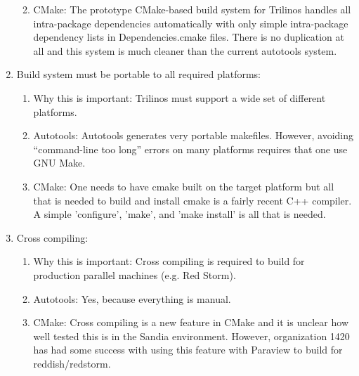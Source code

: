 \documentclass[pdf,ps2pdf,11pt]{SANDreport}
\begin{document}
\begin{enumerate}
\begin{enumerate}
  {}\item CMake: The prototype CMake-based build system for Trilinos
  handles all intra-package dependencies automatically with only simple
  intra-package dependency lists in Dependencies.cmake files.  There
  is no duplication at all and this system is much cleaner than the
  current autotools system.

  \end{enumerate}

{}\item Build system must be portable to all required platforms:

  \begin{enumerate}

  {}\item Why this is important: Trilinos must support a wide set of
  different platforms.

  {}\item Autotools: Autotools generates very portable makefiles.
  However, avoiding ``command-line too long'' errors on many
  platforms requires that one use GNU Make.

  {}\item CMake: One needs to have cmake built on the target
  platform but all that is needed to build and install cmake is a
  fairly recent C++ compiler.  A simple 'configure', 'make', and
  'make install' is all that is needed. 

  \end{enumerate}

{}\item Cross compiling:

  \begin{enumerate}

  {}\item Why this is important: Cross compiling is required to build
  for production parallel machines (e.g. Red Storm).

  {}\item Autotools: Yes, because everything is manual.

  {}\item CMake: Cross compiling is a new feature in CMake and it is
  unclear how well tested this is in the Sandia environment.  However,
  organization 1420 has had some success with using this feature with
  Paraview to build for reddish/redstorm.

  \end{enumerate}

\end{enumerate}
\end{document}
